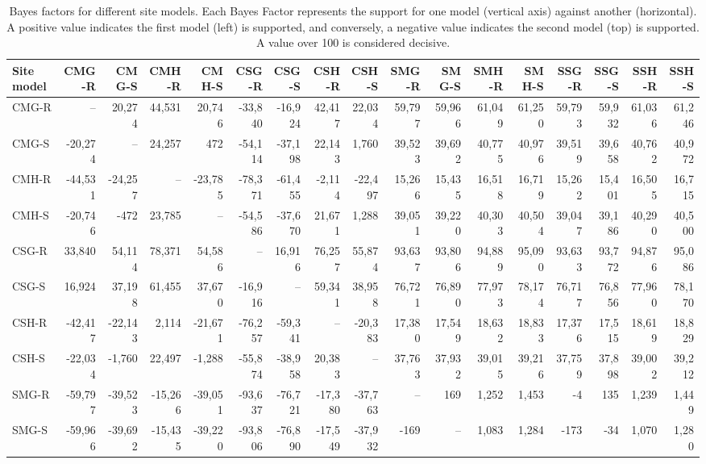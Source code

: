 \begin{table}

\caption[Bayes factors for different site models]{\label{tab:site-models}Bayes factors for different site models. Each Bayes Factor represents the support for one model (vertical axis) against another (horizontal). A positive value indicates the first model (left) is supported, and conversely, a negative value indicates the second model (top) is supported. A value over 100 is considered decisive.}
\centering
\fontsize{8}{10}\selectfont
\begin{tabular}[t]{lrrrrrrrrrrrrrrrr}
\toprule
Site model & CMG-R & CMG-S & CMH-R & CMH-S & CSG-R & CSG-S & CSH-R & CSH-S & SMG-R & SMG-S & SMH-R & SMH-S & SSG-R & SSG-S & SSH-R & SSH-S\\
\midrule
CMG-R & -- & 20,274 & 44,531 & 20,746 & -33,840 & -16,924 & 42,417 & 22,034 & 59,797 & 59,966 & 61,049 & 61,250 & 59,793 & 59,932 & 61,036 & 61,246\\
CMG-S & -20,274 & -- & 24,257 & 472 & -54,114 & -37,198 & 22,143 & 1,760 & 39,523 & 39,692 & 40,775 & 40,976 & 39,519 & 39,658 & 40,762 & 40,972\\
CMH-R & -44,531 & -24,257 & -- & -23,785 & -78,371 & -61,455 & -2,114 & -22,497 & 15,266 & 15,435 & 16,518 & 16,719 & 15,262 & 15,401 & 16,505 & 16,715\\
CMH-S & -20,746 & -472 & 23,785 & -- & -54,586 & -37,670 & 21,671 & 1,288 & 39,051 & 39,220 & 40,303 & 40,504 & 39,047 & 39,186 & 40,290 & 40,500\\
\addlinespace
CSG-R & 33,840 & 54,114 & 78,371 & 54,586 & -- & 16,916 & 76,257 & 55,874 & 93,637 & 93,806 & 94,889 & 95,090 & 93,633 & 93,772 & 94,876 & 95,086\\
CSG-S & 16,924 & 37,198 & 61,455 & 37,670 & -16,916 & -- & 59,341 & 38,958 & 76,721 & 76,890 & 77,973 & 78,174 & 76,717 & 76,856 & 77,960 & 78,170\\
CSH-R & -42,417 & -22,143 & 2,114 & -21,671 & -76,257 & -59,341 & -- & -20,383 & 17,380 & 17,549 & 18,632 & 18,833 & 17,376 & 17,515 & 18,619 & 18,829\\
CSH-S & -22,034 & -1,760 & 22,497 & -1,288 & -55,874 & -38,958 & 20,383 & -- & 37,763 & 37,932 & 39,015 & 39,216 & 37,759 & 37,898 & 39,002 & 39,212\\
\addlinespace
SMG-R & -59,797 & -39,523 & -15,266 & -39,051 & -93,637 & -76,721 & -17,380 & -37,763 & -- & 169 & 1,252 & 1,453 & -4 & 135 & 1,239 & 1,449\\
SMG-S & -59,966 & -39,692 & -15,435 & -39,220 & -93,806 & -76,890 & -17,549 & -37,932 & -169 & -- & 1,083 & 1,284 & -173 & -34 & 1,070 & 1,280\\

\end{tabular}
\end{table}
